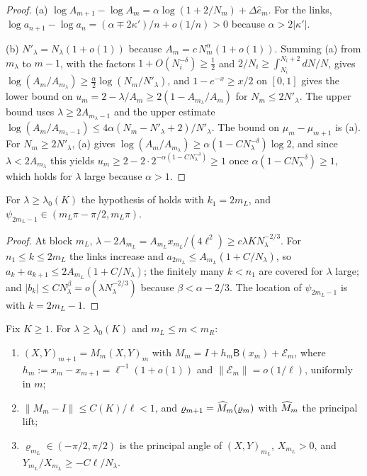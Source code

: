 \begin{proof}
(a) $\log A_{m+1}-\log A_m=\alpha\log(1+2/N_m)+\Delta\hat e_m$. For the links,
$\log a_{n+1}-\log a_n=(\alpha\mp2\kappa')/n+o(1/n)>0$ because $\alpha>2|\kappa'|$.

(b) $N'_\lambda=N_\lambda(1+o(1))$ because $A_m=c\,N_m^\alpha(1+o(1))$. Summing (a) from $m_\lambda$
to $m-1$, with the factors $1+O(N_i^{-\delta})\ge\frac12$ and $2/N_i\ge\int_{N_i}^{N_i+2}dN/N$, gives
$\log(A_m/A_{m_\lambda})\ge\frac\alpha2\log(N_m/N'_\lambda)$, and $1-e^{-x}\ge x/2$ on $[0,1]$
gives the lower bound on $u_m=2-\lambda/A_m\ge2(1-A_{m_\lambda}/A_m)$ for $N_m\le2N'_\lambda$.
The upper bound uses $\lambda\ge2A_{m_\lambda-1}$ and the upper estimate
$\log(A_m/A_{m_\lambda-1})\le4\alpha(N_m-N'_\lambda+2)/N'_\lambda$. The bound on $\mu_m-\mu_{m+1}$ is
(a). For $N_m\ge2N'_\lambda$, (a) gives
$\log(A_m/A_{m_\lambda})\ge\alpha(1-CN_\lambda^{-\delta})\log2$, and since
$\lambda<2A_{m_\lambda}$ this yields $u_m\ge2-2\cdot2^{-\alpha(1-CN_\lambda^{-\delta})}\ge1$ once
$\alpha(1-CN_\lambda^{-\delta})\ge1$, which holds for $\lambda$ large because $\alpha>1$.
\end{proof}

\begin{lemma}\label{lem:startwindow}
For $\lambda\ge\lambda_0(K)$ the hypothesis of  holds with $k_1=2m_L$, and
$\psi_{2m_L-1}\in(m_L\pi-\pi/2,m_L\pi)$.
\end{lemma}

\begin{proof}
At block $m_L$, $\lambda-2A_{m_L}=A_{m_L}x_{m_L}/(4\ell^2)\ge c\lambda KN_\lambda^{-2/3}$. For
$n_1\le k\le2m_L$ the links increase and $a_{2m_L}\le A_{m_L}(1+C/N_\lambda)$, so
$a_k+a_{k+1}\le2A_{m_L}(1+C/N_\lambda)$; the finitely many $k<n_1$ are covered for $\lambda$
large; and $|b_k|\le CN_\lambda^\beta=o(\lambda N_\lambda^{-2/3})$ because
$\beta<\alpha-2/3$. The location of $\psi_{2m_L-1}$ is  with $k=2m_L-1$.
\end{proof}

\begin{lemma}\label{lem:airycoords}
Fix $K\ge1$. For $\lambda\ge\lambda_0(K)$ and $m_L\le m<m_R$:
\begin{enumerate}
\item[(a)] $(X,Y)_{m+1}=M_m(X,Y)_m$ with $M_m=I+h_m\mathsf B(x_m)+\mathcal E_m$, where
  $h_m:=x_m-x_{m+1}=\ell^{-1}(1+o(1))$ and $\|\mathcal E_m\|=o(1/\ell)$, uniformly in $m$;
\item[(b)] $\|M_m-I\|\le C(K)/\ell<1$, and $\varrho_{m+1}=\widehat M_m(\varrho_m)$ with $\widehat M_m$ the principal lift;
\item[(c)] $\varrho_{m_L}\in(-\pi/2,\pi/2)$ is the principal angle of $(X,Y)_{m_L}$, $X_{m_L}>0$, and
  $Y_{m_L}/X_{m_L}\ge-C\ell/N_\lambda$.
\end{enumerate}
\end{lemma}

